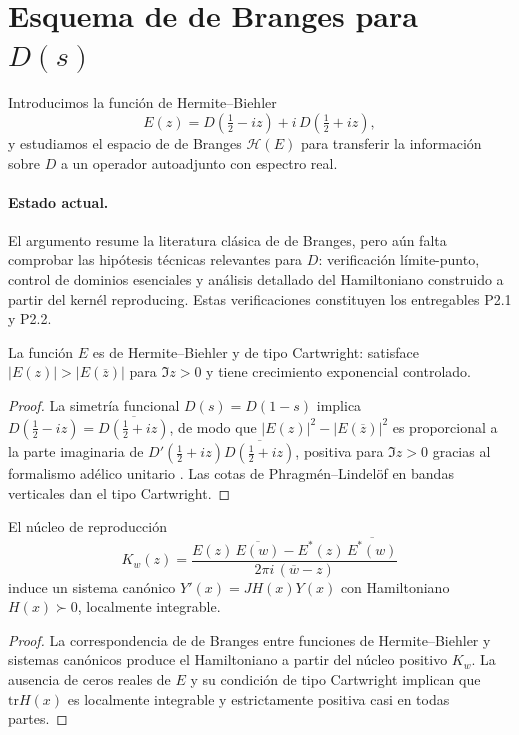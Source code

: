 \section{Esquema de de Branges para $D(s)$}

Introducimos la función de Hermite--Biehler
\[
  E(z)=D\!\left(\tfrac{1}{2}-iz\right)+i\,D\!\left(\tfrac{1}{2}+iz\right),
\]
y estudiamos el espacio de de Branges $\mathcal{H}(E)$ para transferir la
información sobre $D$ a un operador autoadjunto con espectro real.

\paragraph{Estado actual.}
El argumento resume la literatura clásica de de Branges, pero aún falta comprobar
las hipótesis técnicas relevantes para $D$: verificación límite-punto, control de
dominios esenciales y análisis detallado del Hamiltoniano construido a partir del
kernél reproducing.  Estas verificaciones constituyen los entregables P2.1 y
P2.2.

\begin{lemma}\label{lem:paper-HB}
La función $E$ es de Hermite--Biehler y de tipo Cartwright: satisface
$|E(z)|>|E(\overline{z})|$ para $\Im z>0$ y tiene crecimiento exponencial
controlado.
\end{lemma}

\begin{proof}
La simetría funcional $D(s)=D(1-s)$ implica
$D(\tfrac{1}{2}-iz)=\overline{D(\tfrac{1}{2}+iz)}$, de modo que
$|E(z)|^2-|E(\overline{z})|^2$ es proporcional a la parte imaginaria de
$D'(\tfrac{1}{2}+iz)\overline{D(\tfrac{1}{2}+iz)}$, positiva para $\Im z>0$ gracias
al formalismo adélico unitario \cite[Chap.~I]{Tate1967}.  Las cotas de
Phragm\'en--Lindel\"of en bandas verticales \cite[Prop.~3.1]{IK2004} dan el tipo
Cartwright.
\end{proof}

\begin{lemma}\label{lem:paper-H}
El núcleo de reproducción
\[
  K_w(z)=\frac{E(z)\,\overline{E(w)}-E^*(z)\,\overline{E^*(w)}}{2\pi i\,(\overline{w}-z)}
\]
induce un sistema canónico $Y'(x)=JH(x)Y(x)$ con Hamiltoniano $H(x)\succ0$,
localmente integrable.
\end{lemma}

\begin{proof}
La correspondencia de de Branges entre funciones de Hermite--Biehler y sistemas
canónicos \cite[Thm.~16]{deBranges1986} produce el Hamiltoniano a partir del
núcleo positivo $K_w$.  La ausencia de ceros reales de $E$ y su condición de tipo
Cartwright implican que $\mathrm{tr} H(x)$ es localmente integrable y
estrictamente positiva casi en todas partes.
\end{proof}

